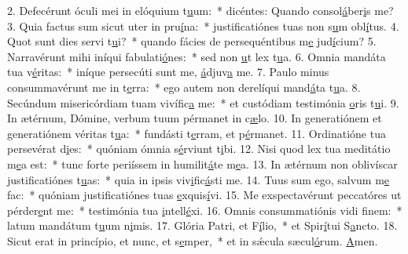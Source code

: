 2. Defecérunt óculi mei in elóquium t\uline{u}um:~* dicéntes: Quando consol\uline{á}ber\uline{i}s me?
3. Quia factus sum sicut uter in pru\uline{í}na:~* justificatiónes tuas non s\uline{u}m obl\uline{í}tus.
4. Quot sunt dies servi t\uline{u}i?~* quando fácies de persequéntibus m\uline{e} jud\uline{í}cium?
5. Narravérunt mihi iníqui fabulati\uline{ó}nes:~* sed non \uline{u}t lex t\uline{u}a.
6. Omnia mandáta tua v\uline{é}ritas:~* iníque persecúti sunt me, \uline{á}djuv\uline{a} me.
7. Paulo minus consummavérunt me in t\uline{e}rra:~* ego autem non derelíqui mand\uline{á}ta t\uline{u}a.
8. Secúndum misericórdiam tuam vivífic\uline{a} me:~* et custódiam testimónia \uline{o}ris t\uline{u}i.
9. In ætérnum, Dómine, verbum tuum pérmanet in c\uline{æ}lo.
10. In generatiónem et generatiónem véritas t\uline{u}a:~* fundásti t\uline{e}rram, et p\uline{é}rmanet.
11. Ordinatióne tua persevérat d\uline{i}es:~* quóniam ómnia s\uline{é}rviunt t\uline{i}bi.
12. Nisi quod lex tua meditátio m\uline{e}a est:~* tunc forte periíssem in humilit\uline{á}te m\uline{e}a.
13. In ætérnum non oblivíscar justificatiónes t\uline{u}as:~* quia in ipsis viv\uline{i}fic\uline{á}sti me.
14. Tuus sum ego, salvum m\uline{e} fac:~* quóniam justificatiónes tuas \uline{e}xquis\uline{í}vi.
15. Me exspectavérunt peccatóres ut pérder\uline{e}nt me:~* testimónia tua \uline{i}ntell\uline{é}xi.
16. Omnis consummatiónis vidi f\uline{i}nem:~* latum mandátum t\uline{u}um n\uline{i}mis.
17. Glória Patri, et F\uline{í}lio,~* et Spir\uline{í}tui S\uline{a}ncto.
18. Sicut erat in princípio, et nunc, et s\uline{e}mper,~* et in sǽcula sæcul\uline{ó}rum. \uline{A}men.
